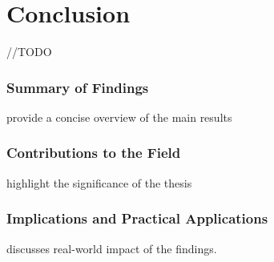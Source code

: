 \chapter{Conclusion}
\label{ch:conclusion}
//TODO

\subsection{Summary of Findings}
provide a concise overview of the main results

\subsection{Contributions to the Field}
highlight the significance of the thesis

\subsection{Implications and Practical Applications}
discusses real-world impact of the findings.